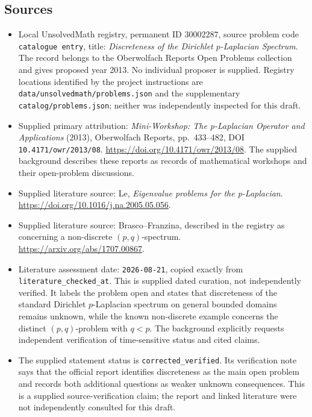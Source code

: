 \documentclass[11pt]{article}
\begin{document}
\subsection{Sources}
\begin{itemize}
\item Local UnsolvedMath registry, permanent ID \(30002287\), source problem code \texttt{catalogue entry}, title: \emph{Discreteness of the Dirichlet \(p\)-Laplacian Spectrum}. The record belongs to the Oberwolfach Reports Open Problems collection and gives proposed year 2013. No individual proposer is supplied. Registry locations identified by the project instructions are \texttt{data/unsolvedmath/problems.json} and the supplementary \texttt{catalog/problems.json}; neither was independently inspected for this draft.
\item Supplied primary attribution: \emph{Mini-Workshop: The p-Laplacian Operator and Applications} (2013), Oberwolfach Reports, pp.~433--482, DOI \texttt{10.4171/owr/2013/08}. \url{https://doi.org/10.4171/owr/2013/08}. The supplied background describes these reports as records of mathematical workshops and their open-problem discussions.
\item Supplied literature source: Le, \emph{Eigenvalue problems for the p-Laplacian}. \url{https://doi.org/10.1016/j.na.2005.05.056}.
\item Supplied literature source: Brasco--Franzina, described in the registry as concerning a non-discrete \((p,q)\)-spectrum. \url{https://arxiv.org/abs/1707.00867}.
\item Literature assessment date: \texttt{2026-08-21}, copied exactly from \texttt{literature\_checked\_at}. This is supplied dated curation, not independently verified. It labels the problem open and states that discreteness of the standard Dirichlet \(p\)-Laplacian spectrum on general bounded domains remains unknown, while the known non-discrete example concerns the distinct \((p,q)\)-problem with \(q<p\). The background explicitly requests independent verification of time-sensitive status and cited claims.
\item The supplied statement status is \texttt{corrected\_verified}. Its verification note says that the official report identifies discreteness as the main open problem and records both additional questions as weaker unknown consequences. This is a supplied source-verification claim; the report and linked literature were not independently consulted for this draft.
\end{itemize}
\end{document}
